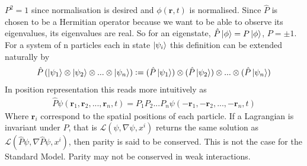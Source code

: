 $P^2=1$ since normalisation is desired and $\phi(\mathbf{r},t)$ is normalised. Since $\hat{P}$ is chosen to be a Hermitian operator because we want to be able to observe its eigenvalues, its eigenvalues are real. So for an eigenstate, $\hat{P}\ket{\phi}=P\ket{\phi}$, $P=\pm 1$. For a system of n particles each in state $\ket{\psi_i}$ this definition can be extended naturally by
\begin{align*}
\hat{P}\left(\ket{\psi_1}\otimes\ket{\psi_2}\otimes...\otimes\ket{\psi_n}\right) \vcentcolon= (\hat{P}\ket{\psi_1})\otimes(\hat{P}\ket{\psi_2})\otimes...\otimes(\hat{P}\ket{\psi_n})
\end{align*}
In position representation this reads more intuitively as
\begin{align*}
\hat{P}\psi(\mathbf{r}_1,\mathbf{r}_2,...,\mathbf{r}_n,t)=P_1P_2...P_n\psi(-\mathbf{r}_1,-\mathbf{r}_2,...,-\mathbf{r}_n,t)
\end{align*}
Where $\mathbf{r}_i$ correspond to the spatial positions of each particle. If a Lagrangian is invariant under $\hat{P}$, that is $\mathcal{L}(\psi,\nabla \psi,x^i)$ returns the same solution as $\mathcal{L}(\hat{P}\psi,\nabla \hat{P}\psi,x^i)$, then parity is said to be conserved. This is not the case for the Standard Model. Parity may not be conserved in weak interactions.

